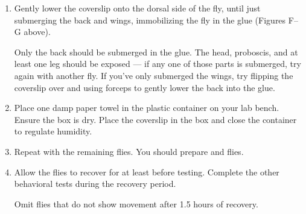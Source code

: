 \documentclass[letterpaper,10pt,english]{jupyterBook}
\begin{document}
\sphinxAtStartPar
{}
\begin{enumerate}
%
\setcounter{enumi}{4}
\item {} 
\sphinxAtStartPar
Gently lower the coverslip onto the dorsal side of the fly, until just submerging the back and wings, immobilizing the fly in the glue (Figures F–G above).

\sphinxAtStartPar
{} Only the back should be submerged in the glue. The head, proboscis, and at least one leg should be exposed — if any one of those parts is submerged, try again with another fly. If you’ve only submerged the wings, try flipping the coverslip over and using forceps to gently lower the back into the glue.

\item {} 
\sphinxAtStartPar
Place one damp paper towel in the plastic container on your lab bench. Ensure the box is dry. Place the coverslip in the box and close the container to regulate humidity.

\item {} 
\sphinxAtStartPar
Repeat with the remaining flies. You should prepare  and  flies.

\item {} 
\sphinxAtStartPar
Allow the flies to recover for at least  before testing. Complete the other behavioral tests during the recovery period.

\sphinxAtStartPar
{} Omit flies that do not show movement after 1.5 hours of recovery.

\end{enumerate}
\end{document}
